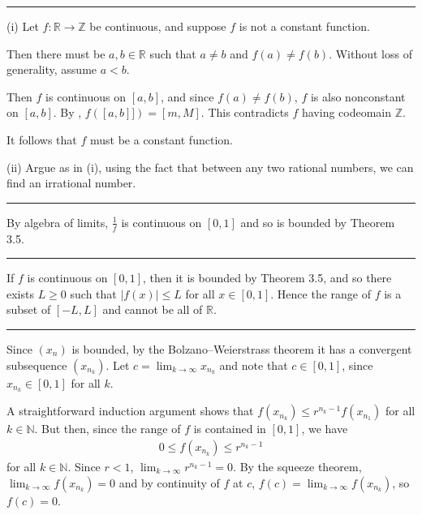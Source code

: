\documentclass[letterpaper,10pt,english]{jupyterBook}
\begin{document}
\bigskip\hrule\bigskip


\sphinxAtStartPar
{\hyperref[\detokenize{Problems:id27}]{}} (i) Let \(f:\mathbb{R}\to\mathbb{Z}\) be continuous, and suppose \(f\) is not a constant function.

\sphinxAtStartPar
Then there must be \(a,b\in\mathbb{R}\) such that \(a\neq b\) and \(f(a)\neq f(b)\). Without loss of generality, assume \(a<b\).

\sphinxAtStartPar
Then \(f\) is continuous on \([a,b]\), and since \(f(a)\neq f(b)\), \(f\) is also non\sphinxhyphen{}constant on \([a,b]\). By , \(f([a,b]])=[m,M]\). This contradicts \(f\) having codeomain \(\mathbb{Z}\).

\sphinxAtStartPar
It follows that \(f\) must be a constant function.

\sphinxAtStartPar
(ii) Argue as in (i), using the fact that between any two rational numbers, we can find an irrational number.


\bigskip\hrule\bigskip


\sphinxAtStartPar
{\hyperref[\detokenize{Problems:id28}]{}} By algebra of limits, \(\frac{1}{f}\) is continuous on \([0, 1]\) and so is bounded by Theorem 3.5.


\bigskip\hrule\bigskip


\sphinxAtStartPar
{\hyperref[\detokenize{Problems:id29}]{}}

If \(f\) is continuous on \([0, 1]\), then it is bounded by Theorem 3.5, and so there exists \(L \geq 0\) such that \(|f(x)| \leq L\) for all \(x \in [0, 1]\). Hence the range of \(f\) is a subset of  \([-L, L]\) and cannot be all of \(\mathbb{R}\).


\bigskip\hrule\bigskip


\sphinxAtStartPar
{\hyperref[\detokenize{Problems:id30}]{}} Since \((x_{n})\) is bounded, by the Bolzano–Weierstrass theorem it has a convergent subsequence \((x_{n_{k}})\). Let \(c=\lim_{k \rightarrow \infty}x_{n_{k}}\) and note that \(c \in [0, 1]\), since \(x_{n_k}\in[0,1]\) for all \(k\).

A straight\sphinxhyphen{}forward induction argument shows that \(f(x_{n_{k}}) \leq r^{n_{k}-1}f(x_{n_{1}})\) for all \(k\in\mathbb{N}\). But then, since the range of \(f\) is contained in \([0,1]\), we have
\begin{equation*}
\begin{split}
0 \leq f(x_{n_{k}}) \leq r^{n_{k}-1}
\end{split}
\end{equation*}
\sphinxAtStartPar
for all \(k\in\mathbb{N}\). Since \(r < 1\), \(\lim_{k\to\infty} r^{n_k-1} =0\). By the squeeze theorem, \( \lim_{k \rightarrow \infty}f(x_{n_{k}}) = 0\) and by continuity of \(f\) at \(c\), \(f(c) = \lim_{k \rightarrow \infty}f(x_{n_{k}})\), so \(f(c)=0\).
\end{document}
